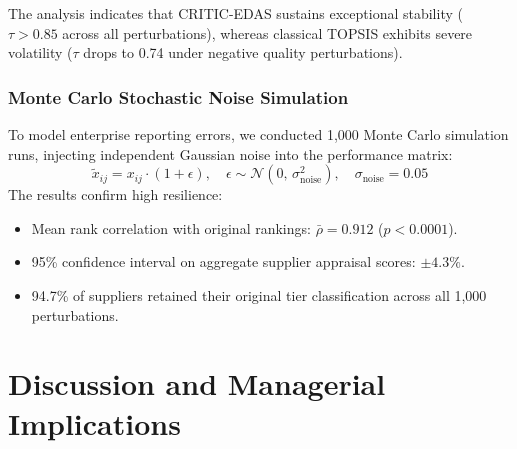 \documentclass[twocolumn,10pt]{article}
\begin{document}
The analysis indicates that CRITIC-EDAS sustains exceptional stability ($\tau > 0.85$ across all perturbations), whereas classical TOPSIS exhibits severe volatility ($\tau$ drops to 0.74 under negative quality perturbations).

\subsubsection{Monte Carlo Stochastic Noise Simulation}
To model enterprise reporting errors, we conducted 1,000 Monte Carlo simulation runs, injecting independent Gaussian noise into the performance matrix:
\begin{equation}
    \tilde{x}_{ij} = x_{ij} \cdot (1 + \epsilon), \quad \epsilon \sim \mathcal{N}(0, \, \sigma_{\text{noise}}^2), \quad \sigma_{\text{noise}} = 0.05
    \label{eq:monte_carlo}
\end{equation}
The results confirm high resilience:
\begin{itemize}
    \item Mean rank correlation with original rankings: $\bar{\rho} = 0.912$ ($p < 0.0001$).
    \item 95\% confidence interval on aggregate supplier appraisal scores: $\pm 4.3\%$.
    \item 94.7\% of suppliers retained their original tier classification across all 1,000 perturbations.
\end{itemize}

\section{Discussion and Managerial Implications}
\label{sec:discussion}
\end{document}
